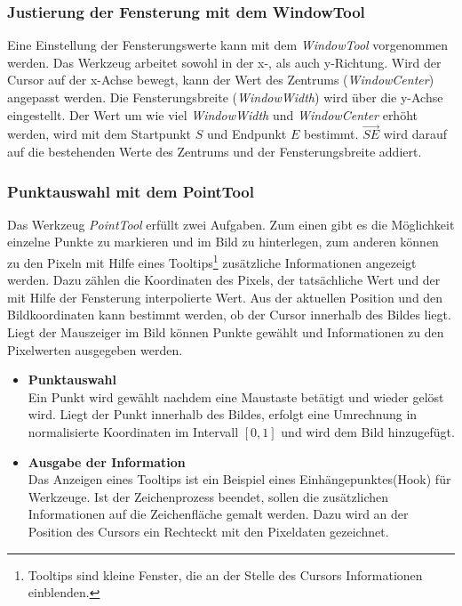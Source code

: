 \subsubsection{Justierung der Fensterung mit dem WindowTool}

Eine Einstellung der Fensterungswerte kann mit dem \textit{WindowTool} vorgenommen werden. Das Werkzeug arbeitet sowohl in der x-, als auch y-Richtung. Wird der Cursor auf der x-Achse bewegt, kann der Wert des Zentrums (\textit{WindowCenter}) angepasst werden. Die Fensterungsbreite (\textit{WindowWidth}) wird über die y-Achse eingestellt. Der Wert um wie viel \textit{WindowWidth} und \textit{WindowCenter} erhöht werden, wird mit dem Startpunkt $S$ und Endpunkt $E$ bestimmt. $\overrightarrow{SE}$ wird darauf auf die bestehenden Werte des Zentrums und der Fensterungsbreite addiert.

\subsubsection{Punktauswahl mit dem PointTool}

Das Werkzeug \textit{PointTool} erfüllt zwei Aufgaben. Zum einen gibt es die Möglichkeit einzelne Punkte zu markieren und im Bild zu hinterlegen, zum anderen können zu den Pixeln mit Hilfe eines Tooltips\footnote{Tooltips sind kleine Fenster, die an der Stelle des Cursors Informationen einblenden.} zusätzliche Informationen angezeigt werden. Dazu zählen die Koordinaten des Pixels, der tatsächliche Wert und der mit Hilfe der Fensterung interpolierte Wert. Aus der aktuellen Position und den Bildkoordinaten kann bestimmt werden, ob der Cursor innerhalb des Bildes liegt. Liegt der Mauszeiger im Bild können Punkte gewählt und Informationen zu den Pixelwerten ausgegeben werden.
\begin{itemize}
\item \textbf{Punktauswahl}\\
	Ein Punkt wird gewählt nachdem eine Maustaste betätigt und wieder gelöst wird. Liegt der Punkt innerhalb des Bildes, erfolgt eine Umrechnung in normalisierte Koordinaten im Intervall $[0,1]$ und wird dem Bild hinzugefügt.
\item \textbf{Ausgabe der Information}\\
	Das Anzeigen eines Tooltips ist ein Beispiel eines Einhängepunktes(Hook) für Werkzeuge. Ist der Zeichenprozess beendet, sollen die zusätzlichen Informationen auf die Zeichenfläche gemalt werden.
	Dazu wird an der Position des Cursors ein Rechteckt mit den Pixeldaten gezeichnet.
\end{itemize}


